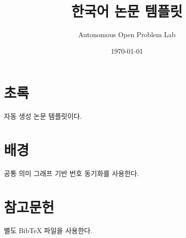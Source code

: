 \documentclass[11pt]{article}
\title{한국어 논문 템플릿}
\author{Autonomous Open Problem Lab}
\date{\today}
\begin{document}
\maketitle
\section*{초록}
자동 생성 논문 템플릿이다.
\section{배경}
공통 의미 그래프 기반 번호 동기화를 사용한다.
\section{참고문헌}
별도 BibTeX 파일을 사용한다.
\end{document}

